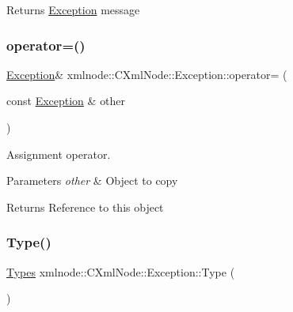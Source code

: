 \begin{DoxyReturn}{Returns}
\mbox{\hyperlink{classxmlnode_1_1_c_xml_node_1_1_exception}{Exception}} message 
\end{DoxyReturn}
\mbox{\label{classxmlnode_1_1_c_xml_node_1_1_exception_a40c0f5e49e54cd97c4643c71fbc34014}} 
\subsubsection{\texorpdfstring{operator=()}{operator=()}}
{\footnotesize\ttfamily \mbox{\hyperlink{classxmlnode_1_1_c_xml_node_1_1_exception}{Exception}}\& xmlnode\+::\+C\+Xml\+Node\+::\+Exception\+::operator= (\begin{DoxyParamCaption}\item[{const \mbox{\hyperlink{classxmlnode_1_1_c_xml_node_1_1_exception}{Exception}} \&}]{other }\end{DoxyParamCaption})\hspace{0.3cm}{\ttfamily [inline]}}



Assignment operator. 


\begin{DoxyParams}{Parameters}
{\em other} & Object to copy \\
\hline
\end{DoxyParams}
\begin{DoxyReturn}{Returns}
Reference to this object 
\end{DoxyReturn}
\mbox{\label{classxmlnode_1_1_c_xml_node_1_1_exception_a872eb6da8739faf5424baf6515b43793}} 
\subsubsection{\texorpdfstring{Type()}{Type()}}
{\footnotesize\ttfamily \mbox{\hyperlink{classxmlnode_1_1_c_xml_node_1_1_exception_abdbe07531ef4b19192f1fa2f819ed75f}{Types}} xmlnode\+::\+C\+Xml\+Node\+::\+Exception\+::\+Type (\begin{DoxyParamCaption}{ }\end{DoxyParamCaption})\hspace{0.3cm}{\ttfamily [inline]}}



